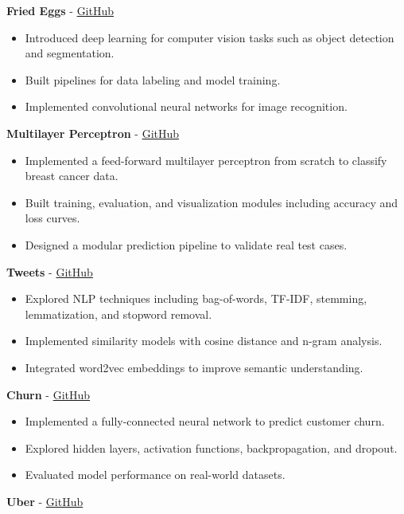 \documentclass[a4paper,11pt]{article}%
\begin{document}
%
\noindent \textbf{Fried Eggs} - \href{https://github.com/sboof911/Fried-eggs}{GitHub}%
\begin{itemize}[leftmargin=2em,label={},parsep=0pt,topsep=1em]%
\item Introduced deep learning for computer vision tasks such as object detection and segmentation.%
\item Built pipelines for data labeling and model training.%
\item Implemented convolutional neural networks for image recognition.%
\end{itemize}%
%
\noindent \textbf{Multilayer Perceptron} - \href{https://github.com/sboof911/Multilayer-Perceptron}{GitHub}%
\begin{itemize}[leftmargin=2em,label={},parsep=0pt,topsep=1em]%
\item Implemented a feed-forward multilayer perceptron from scratch to classify breast cancer data.%
\item Built training, evaluation, and visualization modules including accuracy and loss curves.%
\item Designed a modular prediction pipeline to validate real test cases.%
\end{itemize}%
%
\noindent \textbf{Tweets} - \href{https://github.com/sboof911/tweets}{GitHub}%
\begin{itemize}[leftmargin=2em,label={},parsep=0pt,topsep=1em]%
\item Explored NLP techniques including bag-of-words, TF-IDF, stemming, lemmatization, and stopword removal.%
\item Implemented similarity models with cosine distance and n-gram analysis.%
\item Integrated word2vec embeddings to improve semantic understanding.%
\end{itemize}%
%
\noindent \textbf{Churn} - \href{https://github.com/sboof911/churn}{GitHub}%
\begin{itemize}[leftmargin=2em,label={},parsep=0pt,topsep=1em]%
\item Implemented a fully-connected neural network to predict customer churn.%
\item Explored hidden layers, activation functions, backpropagation, and dropout.%
\item Evaluated model performance on real-world datasets.%
\end{itemize}%
%
\noindent \textbf{Uber} - \href{https://github.com/sboof911/Uber}{GitHub}%
\end{document}
